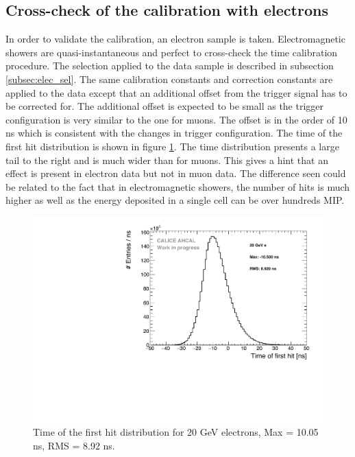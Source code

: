 \subsection{Cross-check of the calibration with electrons}
\label{subsec:validation}

In order to validate the calibration, an electron sample is taken. Electromagnetic showers are quasi-instantaneous and perfect to cross-check the time calibration procedure. The selection applied to the data sample is described in subsection \ref{subsec:elec_sel}. The same calibration constants and correction constants are applied to the data except that an additional offset from the trigger signal has to be corrected for. The additional offset is expected to be small as the trigger configuration is very similar to the one for muons. The offset is in the order of 10 ns which is consistent with the changes in trigger configuration. The time of the first hit distribution is shown in figure \ref{fig:Timing_electrons}. The time distribution presents a large tail to the right and is much wider than for muons. This gives a hint that an effect is present in electron data but not in muon data. The difference seen could be related to the fact that in electromagnetic showers, the number of hits is much higher as well as the energy deposited in a single cell can be over hundreds MIP.

\begin{figure}[t]
	\centering
	\includegraphics[width=1\textwidth]{chap5/fig_AHCAL_timing/Electrons/Timing_AllLayers_AfterMuons.pdf}
	\caption{Time of the first hit distribution for 20 GeV electrons, Max = 10.05 ns, RMS = 8.92 ns.}
	\label{fig:Timing_electrons}
\end{figure}

